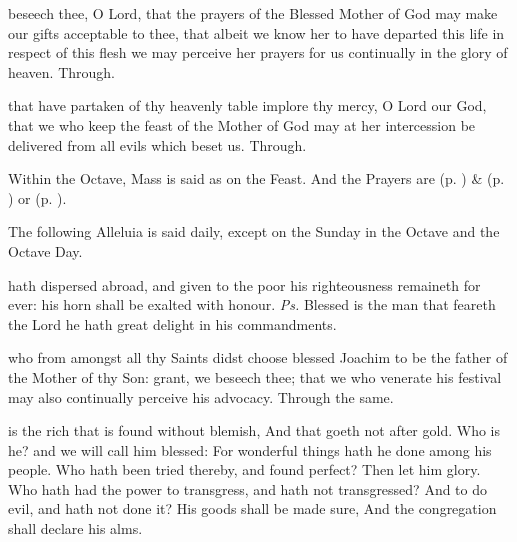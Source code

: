 
\secret
{} beseech thee, O Lord, that the prayers of the Blessed Mother of God may make our gifts acceptable to thee, that albeit we know her to have departed this life in respect of this flesh we may perceive her prayers for us continually in the glory of heaven. Through.


\postcommunion
{} that have partaken of thy heavenly table implore thy mercy, O Lord our God, that we who keep the feast of the Mother of God may at her intercession be delivered from all evils which beset us. Through.

\begin{rubric}
    Within the Octave, Mass is said as on the Feast. And the  Prayers are  (p. \pageref{SPHolyGhost}) \&   (p. \pageref{SPAgainst}) or  (p. \pageref{SPChiefBishop}).
\end{rubric}

\begin{rubric}
    The following Alleluia is said daily, except on the Sunday in the Octave and the Octave Day.
\end{rubric}


\clearpage
{}

\introit
{} hath dispersed abroad, and given to the poor his righteousness remaineth for ever: his horn shall be exalted with honour. \textit{Ps.} Blessed is the man that feareth the Lord he hath great delight in his commandments.

\collect
{} who from amongst all thy Saints didst choose blessed Joachim to be the father of the Mother of thy Son: grant, we beseech thee; that we who venerate his festival may also continually perceive his advocacy. Through the same.

 is the rich that is found without blemish, And that goeth not after gold. Who is he? and we will call him blessed: For wonderful things hath he done among his people. Who hath been tried thereby, and found perfect? Then let him glory. Who hath had the power to transgress, and hath not transgressed? And to do evil, and hath not done it? His goods shall be made sure, And the congregation shall declare his alms.

